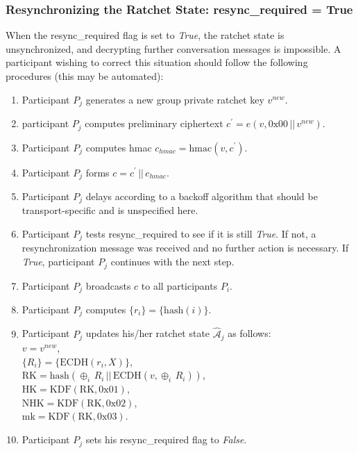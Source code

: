 \documentclass[%
preprint,
amsmath,amssymb,
aps,
prb,
floatfix,
]{revtex4-1}
\begin{document}
\subsubsection{\label{sec:sendresync}Resynchronizing the Ratchet State:
resync\_required = True}
When the resync\_required flag is set to \textit{True}, the ratchet state is
unsynchronized, and decrypting further conversation messages is impossible.
A participant wishing to correct this situation should follow the following
procedures (this may be automated):
\begin{enumerate}
\item Participant $P_j$ generates a new group private ratchet key $v^{new}$.
\item participant $P_j$ computes preliminary ciphertext $c^\prime = e(v, 0\mathrm{x}00
\, || \, v^{new})$.
\item Participant $P_j$ computes hmac $c_{hmac} = \mathrm{hmac}(v, c^\prime)$.
\item Participant $P_j$ forms $c = c^\prime \, || \, c_{hmac}$.
\item Participant $P_j$ delays according to a backoff algorithm
that should be transport-specific and is unspecified here.
\item Participant $P_j$ tests resync\_required to see if it is still
\textit{True}. If not, a resynchronization message was received and no further
action is necessary. If \textit{True}, participant $P_j$ continues with the next
step.
\item Participant $P_j$ broadcasts $c$ to all participants $P_i$.
\item Participant $P_j$ computes $\{r_i\} = \{\mathrm{hash}(i)\}$.
\item Participant $P_j$ updates his/her ratchet state
$\mathcal{\hat{A}}_j$ as follows:\\
$v = v^{new}$, \\
$\{R_i\} = \{\mathrm{ECDH}(r_i, X)\}$, \\
$\mathrm{RK} = \mathrm{hash}(\oplus_i \, R_i \, || \, \mathrm{ECDH}(v, \oplus_i
\, R_i))$, \\
$\mathrm{HK} = \mathrm{KDF}(\mathrm{RK}, 0\mathrm{x}01)$, \\
$\mathrm{NHK} = \mathrm{KDF}(\mathrm{RK}, 0\mathrm{x}02)$, \\
$\mathrm{mk} = \mathrm{KDF}(\mathrm{RK}, 0\mathrm{x}03)$.
\item Participant $P_j$ sets his resync\_required flag to \textit{False}.
\end{enumerate}
\end{document}
